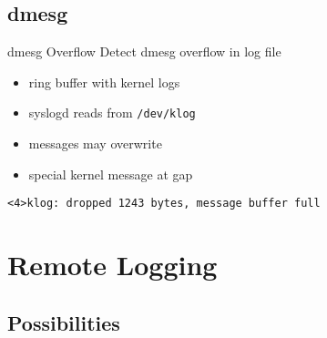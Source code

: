 \documentclass[14pt]{beamer}
\begin{document}
\subsection{dmesg}

\begin{frame}{dmesg Overflow}
    Detect dmesg overflow in log file
\begin{itemize}
    \item ring buffer with kernel logs
    \item syslogd reads from \texttt{/dev/klog}
    \item messages may overwrite
    \item special kernel message at gap
\end{itemize}
    \vspace{.5cm}
    \texttt{<4>klog:\ dropped 1243 bytes, message buffer full}
\end{frame}

\section{Remote Logging}

\subsection{Possibilities}
\end{document}
